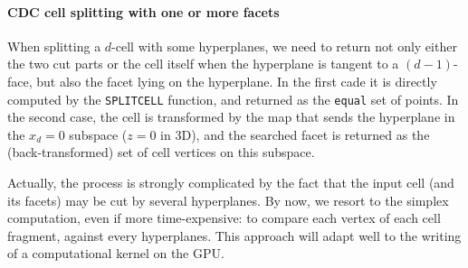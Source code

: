 \documentclass[11pt,oneside]{article}	%
\begin{document}
\paragraph{CDC cell splitting with one or more facets}

When splitting a $d$-cell with some hyperplanes, we need to return not only either the two cut parts or the cell itself when the hyperplane is tangent to a $(d-1)$-face, but also the facet lying on the hyperplane. 
In the first cade it is directly computed by the \texttt{SPLITCELL} function, and returned as the \texttt{equal} set of points. In the second case, the cell is transformed by the map that sends the hyperplane in the $x_d=0$ subspace ($z=0$ in 3D), and the searched facet is returned as the (back-transformed) set of cell vertices on this subspace. 

Actually, the process is strongly complicated by the fact that the input cell (and its facets) may be cut by several hyperplanes. By now, we resort to the simplex computation, even if more time-expensive:  to compare each vertex of each cell fragment, against every hyperplanes. This approach will adapt well to the writing of a computational kernel on the GPU.
\end{document}
